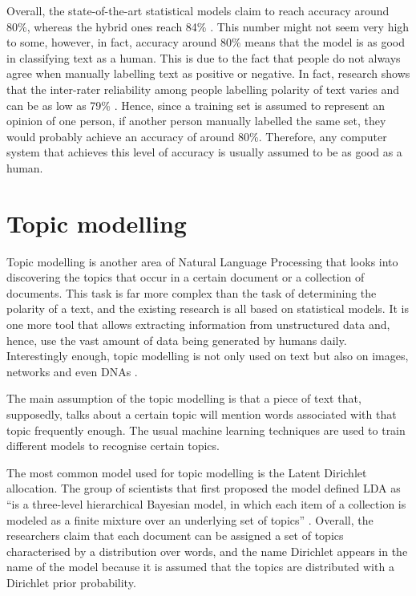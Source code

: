 Overall, the state-of-the-art statistical models claim to reach accuracy around 80\%, whereas the hybrid ones reach 84\% \cite{thakkar2015approaches}. This number might not seem very high to some, however, in fact, accuracy around 80\% means that the model is as good in classifying text as a human. This is due to the fact that people do not always agree when manually labelling text as positive or negative. In fact, research shows that the inter-rater reliability among people labelling polarity of text varies and can be as low as 79\% \cite{bloom2007extracting}. Hence, since a training set is assumed to represent an opinion of one person, if another person manually labelled the same set, they would probably achieve an accuracy of around 80\%. Therefore, any computer system that achieves this level of accuracy is usually assumed to be as good as a human.

\section{Topic modelling}
\label{sec:topic_modelling}

Topic modelling is another area of Natural Language Processing that looks into discovering the topics that occur in a certain document or a collection of documents. This task is far more complex than the task of determining the polarity of a text, and the existing research is all based on statistical models. It is one more tool that allows extracting information from unstructured data and, hence, use the vast amount of data being generated by humans daily. Interestingly enough, topic modelling is not only used on text but also on images, networks and even DNAs \cite{liu2007unsupervised, chang2009relational, lau2013collocations}. 

The main assumption of the topic modelling is that a piece of text that, supposedly, talks about a certain topic will mention words associated with that topic frequently enough. The usual machine learning techniques are used to train different models to recognise certain topics. 

The most common model used for topic modelling is the Latent Dirichlet allocation. The group of scientists that first proposed the model defined LDA as ``is a three-level hierarchical Bayesian model, in which each item of a collection is modeled as a finite mixture over an underlying set of topics'' \cite{blei2003latent}. Overall, the researchers claim that each document can be assigned a set of topics characterised by a distribution over words, and the name Dirichlet appears in the name of the model because it is assumed that the topics are distributed with a Dirichlet prior probability. 

